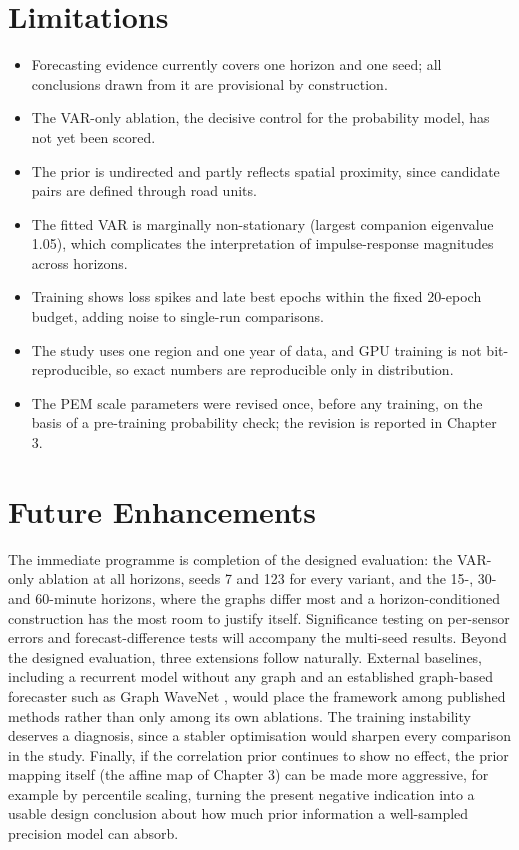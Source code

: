 \documentclass[MTech]{ugthesis}
\begin{document}
\section{Limitations}
\begin{itemize}
\item Forecasting evidence currently covers one horizon and one seed; all conclusions drawn from it are provisional by construction.
\item The VAR-only ablation, the decisive control for the probability model, has not yet been scored.
\item The prior is undirected and partly reflects spatial proximity, since candidate pairs are defined through road units.
\item The fitted VAR is marginally non-stationary (largest companion eigenvalue 1.05), which complicates the interpretation of impulse-response magnitudes across horizons.
\item Training shows loss spikes and late best epochs within the fixed 20-epoch budget, adding noise to single-run comparisons.
\item The study uses one region and one year of data, and GPU training is not bit-reproducible, so exact numbers are reproducible only in distribution.
\item The PEM scale parameters were revised once, before any training, on the basis of a pre-training probability check; the revision is reported in Chapter 3.
\end{itemize}

\section{Future Enhancements}
The immediate programme is completion of the designed evaluation: the VAR-only ablation at all horizons, seeds 7 and 123 for every variant, and the 15-, 30- and 60-minute horizons, where the graphs differ most and a horizon-conditioned construction has the most room to justify itself. Significance testing on per-sensor errors and forecast-difference tests will accompany the multi-seed results. Beyond the designed evaluation, three extensions follow naturally. External baselines, including a recurrent model without any graph and an established graph-based forecaster such as Graph WaveNet \citep{wu2019graphwavenet}, would place the framework among published methods rather than only among its own ablations. The training instability deserves a diagnosis, since a stabler optimisation would sharpen every comparison in the study. Finally, if the correlation prior continues to show no effect, the prior mapping itself (the affine map of Chapter 3) can be made more aggressive, for example by percentile scaling, turning the present negative indication into a usable design conclusion about how much prior information a well-sampled precision model can absorb.
\end{document}
